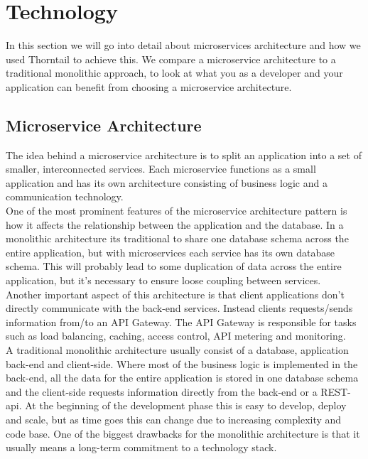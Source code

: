 \section{Technology}
\label{sec:background}

In this section we will go into detail about microservices architecture and how we used Thorntail to achieve this. We compare a microservice architecture to a traditional monolithic approach, to look at what you as a developer and your application can benefit from choosing a microservice architecture.

\subsection{Microservice Architecture}
The idea behind a microservice architecture is to split an application into a set of smaller, interconnected services. Each microservice functions as a small application and has its own architecture consisting of business logic and a communication technology. \\

\noindent One of the most prominent features of the microservice architecture pattern is how it affects the relationship between the application and the database. In a monolithic architecture its traditional to share one database schema across the entire application, but with microservices each service has its own database schema. This will probably lead to some duplication of data across the entire application, but it's necessary to ensure loose coupling between services. \\

\noindent Another important aspect of this architecture is that client applications don’t directly communicate with the back-end services. Instead clients requests/sends information from/to an API Gateway. The API Gateway is responsible for tasks such as load balancing, caching, access control, API metering and monitoring. \cite{MicroArticle}\\

\noindent A traditional monolithic architecture usually consist of a database, application back-end and client-side. Where most of the business logic is implemented in the back-end, all the data for the entire application is stored in one database schema and the client-side requests information directly from the back-end or a REST-api. At the beginning of the development phase this is easy to develop, deploy and scale, but as time goes this can change due to increasing complexity and code base. One of the biggest drawbacks for the monolithic architecture is that it usually means a long-term commitment to a technology stack. \cite{MonolithArch}

